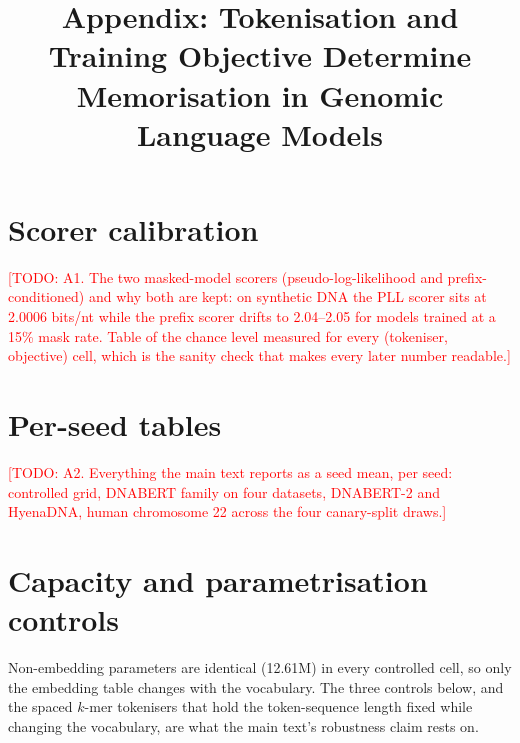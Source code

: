 \documentclass[10pt,letterpaper]{article}
\title{\textbf{Appendix:} Tokenisation and Training Objective Determine Memorisation in Genomic
Language Models}
\author{}\date{}
\newcommand{\TODO}[1]{\textcolor{red}{[TODO: #1]}}
\begin{document}
\maketitle\vspace{-3em}

\section{Scorer calibration}
\TODO{A1. The two masked-model scorers (pseudo-log-likelihood and prefix-conditioned) and why both
are kept: on synthetic DNA the PLL scorer sits at 2.0006 bits/nt while the prefix scorer drifts to
2.04--2.05 for models trained at a 15\% mask rate. Table of the chance level measured for every
(tokeniser, objective) cell, which is the sanity check that makes every later number readable.}

\section{Per-seed tables}
\TODO{A2. Everything the main text reports as a seed mean, per seed: controlled grid, DNABERT family
on four datasets, DNABERT-2 and HyenaDNA, human chromosome 22 across the four canary-split draws.}

\section{Capacity and parametrisation controls}
Non-embedding parameters are identical (12.61M) in every controlled cell, so only the embedding
table changes with the vocabulary. The three controls below, and the spaced $k$-mer tokenisers that
hold the token-sequence length fixed while changing the vocabulary, are what the main text's
robustness claim rests on.
\end{document}

